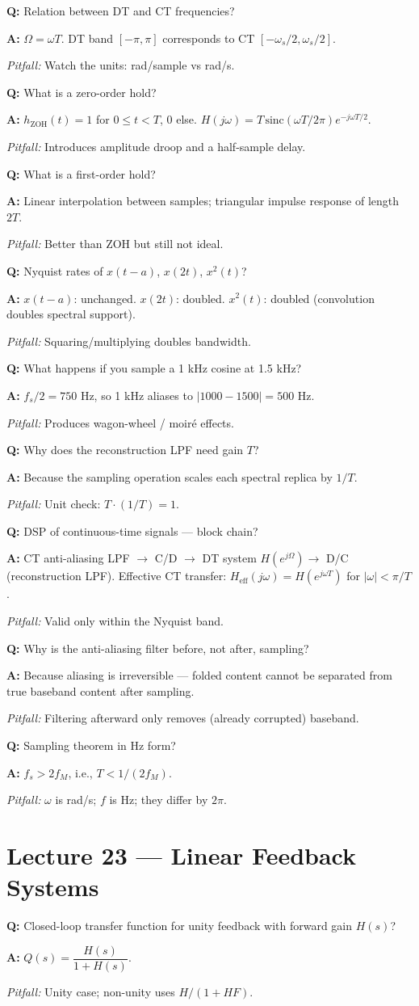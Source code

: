 \documentclass[11pt]{article}
\newcommand{\Q}[1]{\par\medskip\noindent\textbf{Q:} #1}
\newcommand{\A}[1]{\par\noindent\textbf{A:} #1}
\newcommand{\Pit}[1]{\par\noindent\textit{Pitfall:} #1}
\begin{document}
\Q{Relation between DT and CT frequencies?}
\A{$\Omega = \omega T$. DT band $[-\pi,\pi]$ corresponds to CT $[-\omega_s/2,\omega_s/2]$.}
\Pit{Watch the units: rad/sample vs rad/s.}

\Q{What is a zero-order hold?}
\A{$h_{\text{ZOH}}(t)=1$ for $0\le t<T$, 0 else. $H(j\omega) = T\,\text{sinc}(\omega T/2\pi)e^{-j\omega T/2}$.}
\Pit{Introduces amplitude droop and a half-sample delay.}

\Q{What is a first-order hold?}
\A{Linear interpolation between samples; triangular impulse response of length $2T$.}
\Pit{Better than ZOH but still not ideal.}

\Q{Nyquist rates of $x(t-a)$, $x(2t)$, $x^2(t)$?}
\A{$x(t-a)$: unchanged. $x(2t)$: doubled. $x^2(t)$: doubled (convolution doubles spectral support).}
\Pit{Squaring/multiplying doubles bandwidth.}

\Q{What happens if you sample a 1 kHz cosine at 1.5 kHz?}
\A{$f_s/2=750$ Hz, so 1 kHz aliases to $|1000-1500|=500$ Hz.}
\Pit{Produces wagon-wheel / moir\'e effects.}

\Q{Why does the reconstruction LPF need gain $T$?}
\A{Because the sampling operation scales each spectral replica by $1/T$.}
\Pit{Unit check: $T\cdot(1/T)=1$.}

\Q{DSP of continuous-time signals --- block chain?}
\A{CT anti-aliasing LPF $\to$ C/D $\to$ DT system $H(e^{j\Omega}) \to$ D/C (reconstruction LPF). Effective CT transfer: $H_{\text{eff}}(j\omega) = H(e^{j\omega T})$ for $|\omega|<\pi/T$.}
\Pit{Valid only within the Nyquist band.}

\Q{Why is the anti-aliasing filter before, not after, sampling?}
\A{Because aliasing is irreversible --- folded content cannot be separated from true baseband content after sampling.}
\Pit{Filtering afterward only removes (already corrupted) baseband.}

\Q{Sampling theorem in Hz form?}
\A{$f_s > 2f_M$, i.e., $T < 1/(2f_M)$.}
\Pit{$\omega$ is rad/s; $f$ is Hz; they differ by $2\pi$.}

\section{Lecture 23 --- Linear Feedback Systems}

\Q{Closed-loop transfer function for unity feedback with forward gain $H(s)$?}
\A{$Q(s) = \dfrac{H(s)}{1+H(s)}$.}
\Pit{Unity case; non-unity uses $H/(1+HF)$.}
\end{document}
